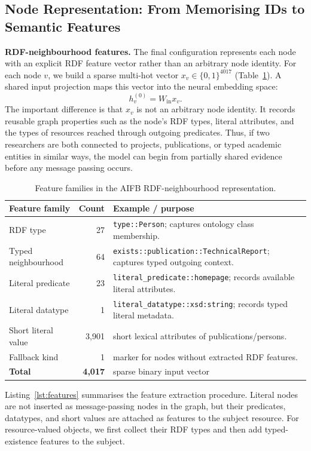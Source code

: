 \documentclass[runningheads]{llncs}
\begin{document}
\subsection{Node Representation: From Memorising IDs to Semantic Features}

\textbf{RDF-neighbourhood features.}
The final configuration represents each node with an explicit RDF feature vector rather than an arbitrary
node identity.  For each node
$v$, we build a sparse multi-hot vector $x_v \in \{0,1\}^{4017}$ (Table~\ref{tab:feature-families}). A shared input projection maps this
vector into the neural embedding space:
\[
h_v^{(0)} = W_{\mathrm{in}}x_v.
\]
The important difference is that $x_v$ is not an arbitrary node identity.  It records reusable graph
properties such as the node's RDF types, literal attributes, and the types of resources reached through
outgoing predicates.  Thus, if two researchers are both connected to projects, publications, or typed
academic entities in similar ways, the model can begin from partially shared evidence before any message
passing occurs.

\begin{table}[ht]
\centering
\small
\caption{Feature families in the AIFB RDF-neighbourhood representation.}
\label{tab:feature-families}
\begin{tabular}{@{}p{3.2cm}rp{6.5cm}@{}}
\toprule
\textbf{Feature family} & \textbf{Count} & \textbf{Example / purpose} \\
\midrule
RDF type & 27 & \texttt{type::Person}; captures ontology class membership. \\
Typed neighbourhood & 64 & \texttt{exists::publication::TechnicalReport}; captures typed outgoing context. \\
Literal predicate & 23 & \texttt{literal\_predicate::homepage}; records available literal attributes. \\
Literal datatype & 1 & \texttt{literal\_datatype::xsd:string}; records typed literal metadata. \\
Short literal value & 3,901 & short lexical attributes of publications/persons. \\
Fallback kind & 1 & marker for nodes without extracted RDF features. \\
\midrule
\textbf{Total} & \textbf{4,017} & sparse binary input vector \\
\bottomrule
\end{tabular}
\end{table}

Listing~\ref{lst:features} summarises the feature extraction procedure.  Literal nodes are not inserted as
message-passing nodes in the graph, but their predicates, datatypes, and short values are attached as
features to the subject resource.  For resource-valued objects, we first collect their RDF types and then
add typed-existence features to the subject.
\end{document}
